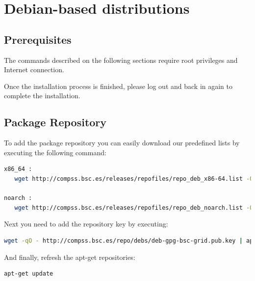 \section{Debian-based distributions}
\label{sec:Debian}


\subsection{Prerequisites}
The commands described on the following sections require root privileges and Internet connection.

Once the installation process is finished, please log out and back in again to complete the installation. 

\subsection{Package Repository}
To add the package repository you can easily download our predefined lists by executing the following command:
\begin{lstlisting}[language=bash]
x86_64 :
   wget http://compss.bsc.es/releases/repofiles/repo_deb_x86-64.list -O /etc/apt/sources.list.d/compss-framework_x86-64.list
   
noarch :
   wget http://compss.bsc.es/releases/repofiles/repo_deb_noarch.list -O /etc/apt/sources.list.d/compss-framework_noarch.list
\end{lstlisting}

Next you need to add the repository key by executing:
\begin{lstlisting}[language=bash]
wget -qO - http://compss.bsc.es/repo/debs/deb-gpg-bsc-grid.pub.key | apt-key add -
\end{lstlisting}

And finally, refresh the apt-get repositories:
\begin{lstlisting}[language=bash]
apt-get update
\end{lstlisting}

